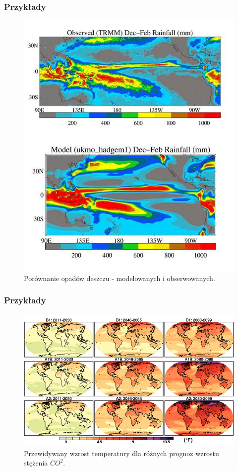 \documentclass{beamer}
\begin{document}
\begin{frame}
	\frametitle{Przykłady}
	\begin{figure}[h]
		\begin{center}
			\includegraphics[width=0.45\linewidth]{images/przyklady/przyklad3.png}
			\caption{Porównanie opadów deszczu - modelowanych i obserwowanych. \cite{b4}}
		\end{center}
	\end{figure}
	
\end{frame}

\begin{frame}
	\frametitle{Przykłady}
	\begin{figure}[h]
		\begin{center}
			\includegraphics[width=0.7\linewidth]{images/przyklady/przyklad4.png}
			\caption{Przewidywany wzrost temperatury dla różnych prognoz wzrostu stężenia $CO^2$.\cite{b6}}
		\end{center}
	\end{figure}
	
\end{frame}
\end{document}
